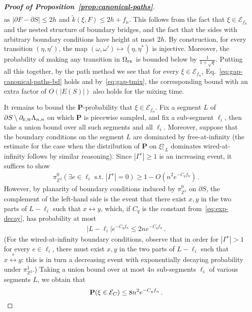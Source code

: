 \documentclass[reqno,11pt]{amsart}
\numberwithin{equation}{section}
\renewcommand{\restriction}{\mathord{\upharpoonright}}
\theoremstyle{definition}{
\newtheorem{example}[theorem]{Example}
\newtheorem{definition}[theorem]{Definition}
\newtheorem*{definition*}{Definition}
\newtheorem{problem}[theorem]{Problem}
\newtheorem{question}[theorem]{Question}
\newtheorem{remark}[theorem]{Remark}
}
\newcommand{\east}{{\textsc{e}}}
\newcommand{\west}{{\textsc{w}}}
\newcommand{\rc}{{\textsc{fk}}}
\begin{document}
\begin{proof}[\textbf{\emph{Proof of Proposition~\ref{prop:canonical-paths}}}]
\begin{align*}
\end{align*}
as $|\partial F-\partial S| \leq 2h$ and $\tilde k(\xi,F) \leq 2h+f_n$. This follows from the fact that $\xi \in \mathcal E_{f_n}$ and the nested structure of boundary bridges, and the fact that the sides with arbitrary boundary conditions have height at most $2h$. By construction, for every transition $(\eta,\eta')$, the map $(\omega,\omega')\mapsto (\eta,\eta^*)$ is injective. Moreover, the probability of making any transition in $\Omega_\rc$ is bounded below by $\frac 1{1+\sqrt q}$. Putting all this together, by the path method we see that for every $\xi \in \mathcal E_{f_n}$, Eq.~\eqref{eq:gap-canonical-paths-bd} holds and by~\eqref{eq:gap-tmix}, the corresponding bound with an extra factor of $O(|E(S)|)$ also holds for the mixing time.

It remains to bound the $\mathbf P$-probability that $\xi\in \mathcal E_{f_n}$.  Fix a segment $L$ of $\partial S\setminus \partial_{\east,\west}\Lambda_{n,n}$ on which $\mathbf P$ is piecewise sampled, and fix a sub-segment $\ell_i$, then take a union bound over all such segments and all $\ell_i$. Moreover, suppose that the boundary conditions on the segment $L$ are dominated by free-at-infinity (the estimate for the case when the distribution of $\mathbf P$ on $\xi\restriction_{L}$ dominates wired-at-infinity follows by similar reasoning). Since $|\Gamma^e|\geq 1$ is an increasing event, it suffices to show
\begin{align*}
\pi_{\mathbb Z^2}^{0}(\exists e\in \ell_i  \mbox{ s.t. } |\Gamma^e|=0) \geq 1-O(n^2 e^{-C_q f_n})\,.
\end{align*}
However, by planarity of boundary conditions induced by $\pi_{\mathbb Z^2}^{0}$ on $\partial S$, the complement of the left-hand side is the event that there exist $x,y$ in the two parts of $L-\ell_i$ such that $x\longleftrightarrow y$, which, if $C_q$ is the constant from~\eqref{eq:exp-decay}, has probability at most 
\begin{align*}
|L-\ell_i| e^{-C_q  f_n} \leq 2ne^{-C_q  f_n}\,.
\end{align*}
(For the wired-at-infinity boundary conditions, observe that in order for $|\Gamma^e| > 1$ for every $e\in \ell_i$,  there must exist $x,y$ in the two parts of $L-\ell_i$ such that $x\stackrel{\ast} \longleftrightarrow y$: this is in turn a decreasing event with exponentially decaying probability under $\pi^1_{\mathbb Z^2}$.) Taking a union bound over at most $4n$ sub-segments $\ell_i$ of various segments $L$, we obtain that
\[
\mathbf P(\xi\in \mathcal E_C) \leq 8 n^2 e^{-C_q f_n}\,. \qedhere
\]
\end{proof}
\end{document}
